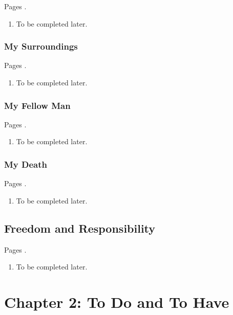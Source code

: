 Pages \autocite[646 -- 657]{sartre}.

\begin{enumerate}
  \item To be completed later.
\end{enumerate}

\subsubsection{My Surroundings}

Pages \autocite[657 -- 663]{sartre}.

\begin{enumerate}
  \item To be completed later.
\end{enumerate}

\subsubsection{My Fellow Man}

Pages \autocite[663 -- 689]{sartre}.

\begin{enumerate}
  \item To be completed later.
\end{enumerate}

\subsubsection{My Death}

Pages \autocite[689 -- 719]{sartre}.

\begin{enumerate}
  \item To be completed later.
\end{enumerate}

\subsection{Freedom and Responsibility}

Pages \autocite[719 -- 722]{sartre}.

\begin{enumerate}
  \item To be completed later.
\end{enumerate}

\section{Chapter 2: To Do and To Have}

